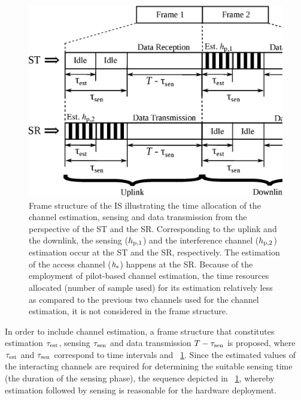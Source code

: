 \begin{figure}[!ht]
\centering
\includegraphics[width = \columnwidth]{figures/Frame_Structure}
\caption{Frame structure of the IS illustrating the time allocation of the channel estimation, sensing and data transmission from the perspective of the ST and the SR. Corresponding to the uplink and the downlink, the sensing ($h_{\text{p,1}}$) and the interference channel ($h_{\text{p,2}}$) estimation occur at the ST and the SR, respectively. The estimation of the access channel ($h_{\text{s}}$) happens at the SR. Because of the employment of pilot-based channel estimation, the time resources allocated (number of sample used) for its estimation relatively less as compared to the previous two channels used for the channel estimation, it is not considered in the frame structure.} 
\label{fig_IS:fs}
\end{figure}
In order to include channel estimation, a frame structure that constitutes estimation $\tau_{\text{est}}$, sensing $\tau_{\text{sen}}$ and data transmission $T - \tau_{\text{sen}}$ is proposed, where $\tau_{\text{est}}$ and $\tau_{\text{sen}}$ correspond to time intervals and  \figurename~{\ref{fig_IS:fs}}. Since the estimated values of the interacting channels are required for determining the suitable sensing time (the duration of the sensing phase), the sequence depicted in \figurename~{\ref{fig_IS:fs}}, whereby estimation followed by sensing is reasonable for the hardware deployment. 
